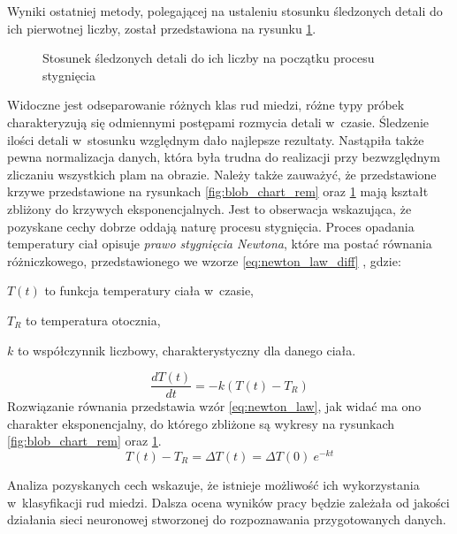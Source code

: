 Wyniki ostatniej metody, polegającej na ustaleniu stosunku śledzonych detali
do ich pierwotnej liczby, został przedstawiona na rysunku
\ref{fig:blob_chart_ratio}.
\begin{figure}[htb]
	\centering
	
	\caption{Stosunek śledzonych detali do ich liczby na początku procesu
		stygnięcia}
	\label{fig:blob_chart_ratio}
\end{figure}
Widoczne jest odseparowanie różnych klas rud miedzi, różne typy próbek
charakteryzują się odmiennymi postępami rozmycia detali w~czasie.
Śledzenie ilości detali w~stosunku względnym dało najlepsze rezultaty.
Nastąpiła także pewna normalizacja danych, która była trudna do realizacji
przy bezwzględnym zliczaniu wszystkich plam na obrazie.
Należy także zauważyć, że przedstawione krzywe przedstawione na rysunkach
\ref{fig:blob_chart_rem} oraz \ref{fig:blob_chart_ratio} mają kształt zbliżony
do krzywych eksponencjalnych.
Jest to obserwacja wskazująca, że pozyskane cechy dobrze oddają naturę procesu
stygnięcia.
Proces opadania temperatury ciał opisuje \emph{prawo stygnięcia Newtona},
które ma postać równania różniczkowego, przedstawionego we wzorze
\ref{eq:newton_law_diff} \cite{lienhard_heat}, gdzie:
\begin{description}
	\item $ T \left( t \right) $ to funkcja temperatury ciała w~czasie,
	\item $ T_R $ to temperatura otocznia,
	\item $ k $ to współczynnik liczbowy, charakterystyczny dla danego ciała.
\end{description}

\begin{equation}
	\frac{dT \left( t \right)}{dt}=-k\left( T \left( t \right) -T_{R} \right)
	\label{eq:newton_law_diff}
\end{equation}
Rozwiązanie równania przedstawia wzór \ref{eq:newton_law}, jak widać ma ono
charakter eksponencjalny, do którego zbliżone są wykresy na rysunkach
\ref{fig:blob_chart_rem} oraz \ref{fig:blob_chart_ratio}.
\begin{equation}
	T(t) - T_{R} = \Delta T (t) = \Delta T (0) \ e^ {-k t}
	\label{eq:newton_law}
\end{equation}

Analiza pozyskanych cech wskazuje, że istnieje możliwość ich wykorzystania
w~klasyfikacji rud miedzi.
Dalsza ocena wyników pracy będzie zależała od jakości działania sieci
neuronowej stworzonej do rozpoznawania przygotowanych danych.
